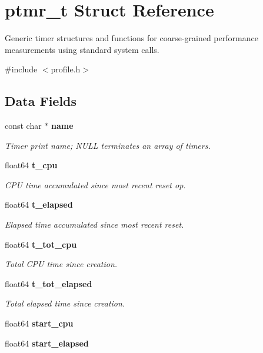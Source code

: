 \section{ptmr\-\_\-t \-Struct \-Reference}
\label{structptmr__t}


\-Generic timer structures and functions for coarse-\/grained performance measurements using standard system calls.  




{\ttfamily \#include $<$profile.\-h$>$}

\subsection*{\-Data \-Fields}
\begin{DoxyCompactItemize}
\item 
const char $\ast$ {\bf name}
\begin{DoxyCompactList}\small\item\em \-Timer print name; \-N\-U\-L\-L terminates an array of timers. \end{DoxyCompactList}\item 
float64 {\bf t\-\_\-cpu}\label{structptmr__t_acbd784f7332329999925d396deae3a5d}

\begin{DoxyCompactList}\small\item\em \-C\-P\-U time accumulated since most recent reset op. \end{DoxyCompactList}\item 
float64 {\bf t\-\_\-elapsed}\label{structptmr__t_a743fce329d82fd7a9130cba5bbccd991}

\begin{DoxyCompactList}\small\item\em \-Elapsed time accumulated since most recent reset. \end{DoxyCompactList}\item 
float64 {\bf t\-\_\-tot\-\_\-cpu}\label{structptmr__t_a301d13acc21718143b8b39b7af8b6677}

\begin{DoxyCompactList}\small\item\em \-Total \-C\-P\-U time since creation. \end{DoxyCompactList}\item 
float64 {\bf t\-\_\-tot\-\_\-elapsed}\label{structptmr__t_a2dc87aa035c8eb542279ca4496dd76f1}

\begin{DoxyCompactList}\small\item\em \-Total elapsed time since creation. \end{DoxyCompactList}\item 
float64 {\bf start\-\_\-cpu}
\item 
float64 {\bf start\-\_\-elapsed}
\end{DoxyCompactItemize}


